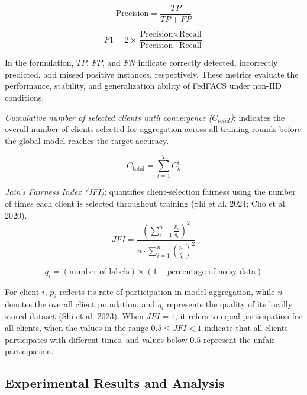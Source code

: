 \documentclass[pdflatex,sn-mathphys-num,oneside]{sn-jnl}%
\theoremstyle{thmstyleone}%
\theoremstyle{thmstyletwo}%
\theoremstyle{thmstylethree}%
\begin{document}
\begin{equation}
\text{Precision} = \frac{TP}{TP + FP}
\label{eq:precision}
\end{equation}

\begin{equation}
F1 = 2 \times \frac{\text{Precision} \times \text{Recall}}
{\text{Precision} + \text{Recall}}
\label{eq:f1_score}
\end{equation}



In the formulation, $TP$, $FP$, and $FN$ indicate correctly detected, incorrectly predicted, and missed positive instances, respectively. These metrics evaluate the performance, stability, and generalization ability of FedFACS under non-IID conditions.


\textit{Cumulative number of selected clients until convergence  ($C_{total}$)}: indicates the overall number of clients selected for aggregation across all training rounds before the global model reaches the target accuracy.

\begin{equation}
C_{\text{total}} = \sum_{t=1}^{T} C_k^t
\label{eq:communication}
\end{equation}

\textit{Jain’s Fairness Index (JFI)}: quantifies client-selection fairness using the number of times each client is selected throughout training (Shi et al. 2024; Cho et al. 2020).
\begin{equation}
JFI = \frac{\left(\sum_{i=1}^{n} \frac{p_i}{q_i}\right)^2}
{n \cdot \sum_{i=1}^{n} \left(\frac{p_i}{q_i}\right)^2}
\label{eq:jfi}
\end{equation}

\begin{equation}
q_i = (\text{number of labels}) \times (1 - \text{percentage of noisy data})
\label{eq:qi}
\end{equation}

For client $i$, $p_i$ reflects its rate of participation in model aggregation, while $n$ denotes the overall client population, and $q_i$ represents the quality of its locally stored dataset (Shi et al. 2023). When $JFI = 1$, it refers to equal participation for all clients, when the values in the range $0.5 \leq JFI < 1$ indicate that all clients participates with different times, and values below $0.5$ represent the unfair participation.

\subsection{Experimental Results and Analysis}
\end{document}
